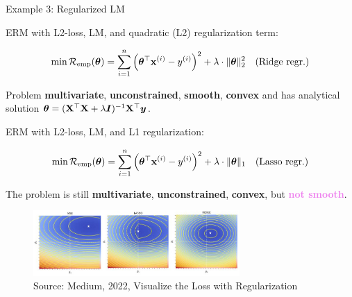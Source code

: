 \documentclass[11pt,compress,t,notes=noshow, xcolor=table]{beamer}
\begin{document}
\begin{vbframe}{Example 3: Regularized LM}

\begin{footnotesize}

ERM with L2-loss, LM, and quadratic (L2) regularization term: 

\vspace*{-0.2cm}

$$
	\min \mathcal{R}_{\text{emp}}(\bm{\theta}) = \sum\limits_{i=1}^n \left(\bm{\theta}^\top \mathbf{x}^{(i)} - y^{(i)}\right)^2  + \lambda \cdot \|\bm{\theta}\|_2^2 \quad \text{(Ridge regr.)}
$$

\vspace*{-0.1cm}


Problem \textbf{multivariate}, \textbf{unconstrained}, \textbf{smooth}, \textbf{convex} and has analytical solution $\bm{\theta} = (\mathbf{X}^\top \mathbf{X} + \lambda \bm{I})^{-1}\mathbf{X}^\top \bm{y}$. 

\vspace*{0.1cm}

ERM with L2-loss, LM, and L1 regularization: 

\vspace*{-0.2cm}

$$
	\min \mathcal{R}_{\text{emp}}(\bm{\theta}) = \sum\limits_{i=1}^n \left(\bm{\theta}^\top \mathbf{x}^{(i)} - y^{(i)}\right)^2  + \lambda \cdot \|\bm{\theta}\|_1 \quad \text{(Lasso regr.)}
$$

\vspace*{-0.1cm}

The problem is still \textbf{multivariate}, \textbf{unconstrained}, \textbf{convex}, but \textcolor{violet}{\textbf{not smooth}}. %

\vspace*{-0.3cm}

\begin{figure}
\begin{center}
	\includegraphics[width=0.7\textwidth]{figure_man/lasso-ridge_medium.jpg}
\end{center}
	\caption{Source: Medium, 2022, Visualize the Loss with Regularization}
\end{figure}

\end{footnotesize}

\end{vbframe}
\end{document}
